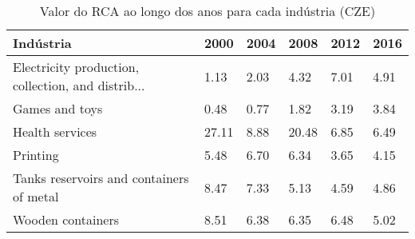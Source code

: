 \begin{table}
\centering
\caption{Valor do RCA ao longo dos anos para cada indústria (CZE)}
\begin{tabular}{p{6cm}p{1.5cm}p{1.5cm}p{1.5cm}p{1.5cm}p{1.5cm}}
\toprule
                                         Indústria &  2000 & 2004 &  2008 & 2012 & 2016 \\
\midrule
Electricity production, collection, and distrib... &  1.13 & 2.03 &  4.32 & 7.01 & 4.91 \\
                                    Games and toys &  0.48 & 0.77 &  1.82 & 3.19 & 3.84 \\
                                   Health services & 27.11 & 8.88 & 20.48 & 6.85 & 6.49 \\
                                          Printing &  5.48 & 6.70 &  6.34 & 3.65 & 4.15 \\
          Tanks reservoirs and containers of metal &  8.47 & 7.33 &  5.13 & 4.59 & 4.86 \\
                                 Wooden containers &  8.51 & 6.38 &  6.35 & 6.48 & 5.02 \\
\bottomrule
\end{tabular}
\end{table}
